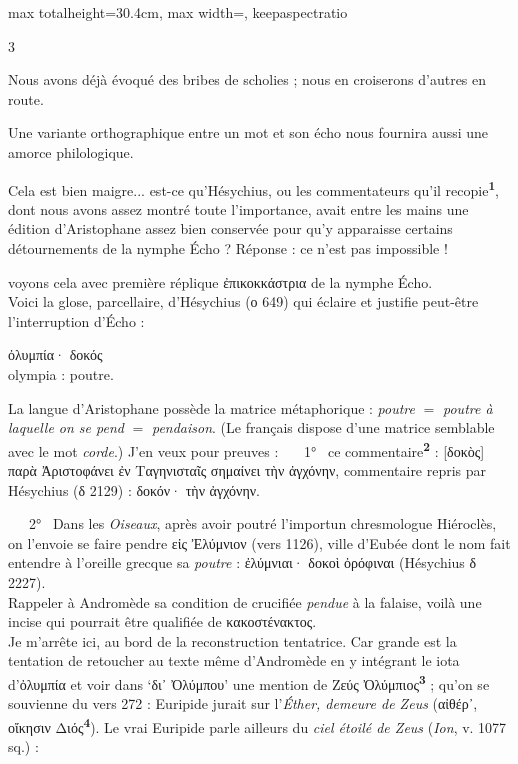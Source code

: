 \documentclass[11pt,twoside]{book}
\newcommand{\italique}[1]{\textit{#1}}
\newcommand{\citComm}[1]{\begin{quoting}[vskip=0.4pt,leftmargin=0.7em,rightmargin=0.2em]#1\end{quoting}}
\newcommand{\marqueur}[1]{\textsuperscript{\color{rubricRed}\textbf{#1}}}
\begin{document}
\begin{adjustbox}{max totalheight=30.4cm, max width=\textwidth, keepaspectratio}
\begin{minipage}{\textwidth}
{\begin{multicols}{3}
\par\vspace{1.5pt}
\noindent Nous avons déjà évoqué des bribes de scholies ; nous en croiserons d'autres en route.
\par\vspace{1.5pt}
\noindent Une variante orthographique entre un mot et son écho nous fournira aussi une amorce philologique.
\par\vspace{1.5pt}
\noindent Cela est bien maigre... est-ce qu'Hésychius, ou les commentateurs qu'il recopie\marqueur{1}, dont nous avons assez montré toute l'importance, avait entre les mains une édition d'Aristophane assez bien conservée pour qu'y apparaisse certains détournements de la nymphe Écho ? Réponse : ce n'est pas impossible !
\par\vspace{1.5pt}
\noindent voyons cela avec première réplique ἐπικοκκάστρια de la nymphe Écho. \\ Voici la glose, parcellaire, d'Hésychius (ο 649) qui éclaire et justifie peut-être l'interruption d'Écho :
\citComm{ὀλυμπία· δοκός\\
olympia : poutre.}
\par\vspace{1.5pt}
\noindent La langue d'Aristophane possède la matrice métaphorique : \italique{poutre} $=$ \italique{poutre à laquelle on se pend} $=$ \italique{pendaison}. (Le français dispose d'une matrice semblable avec le mot \italique{corde}.) J'en veux pour preuves : \ \ \ 1° \ ce commentaire\marqueur{2} : [δοκὸς] παρὰ Ἀριστοφάνει ἐν Ταγηνισταῖς σημαίνει τὴν ἀγχόνην, commentaire repris par Hésychius (δ 2129) : δοκόν· τὴν ἀγχόνην.
\par\vspace{1.5pt}
\noindent \ \ \ 2° \ Dans les \italique{Oiseaux}, après avoir poutré l'importun chresmologue Hiéroclès, on l'envoie se faire pendre εἰς Ἐλύμνιον (vers 1126), ville d'Eubée dont le nom fait entendre à l'oreille grecque sa \italique{poutre} : ἐλύμνιαι· δοκοὶ ὀρόφιναι (Hésychius δ 2227).\\ Rappeler à Andromède sa condition de crucifiée \italique{pendue} à la falaise, voilà une incise qui pourrait être qualifiée de κακοστένακτος.\\ Je m'arrête ici, au bord de la reconstruction tentatrice. Car grande est la tentation de retoucher au texte même d'Andromède en y intégrant le iota d'ὀλυμπία et voir dans `δι᾽ Ὀλύμπου' une mention de Ζεύς Ὀλύμπιος\marqueur{3} ; qu'on se souvienne du vers 272 : Euripide jurait sur l'\italique{Éther, demeure de Zeus} (αἰθέρ᾽, οἴκησιν Διός\marqueur{4}). Le vrai Euripide parle ailleurs du \italique{ciel étoilé de Zeus} (\italique{Ion}, v. 1077 sq.) :

\end{multicols}}
\end{minipage}
\end{adjustbox}
\end{document}
